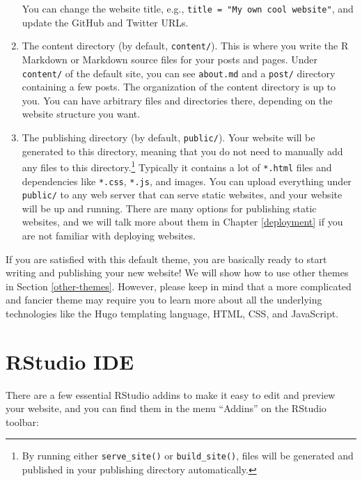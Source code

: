 \documentclass[12pt,]{krantz}
\theoremstyle{definition}
\theoremstyle{definition}
\theoremstyle{definition}
\theoremstyle{remark}
\begin{document}
\begin{enumerate}
  You can change the website title, e.g.,
  \texttt{title\ =\ "My\ own\ cool\ website"}, and update the GitHub and
  Twitter URLs.
\item
  The content directory (by default, \texttt{content/}). This is where
  you write the R Markdown or Markdown source files for your posts and
  pages. Under \texttt{content/} of the default site, you can see
  \texttt{about.md} and a \texttt{post/} directory containing a few
  posts. The organization of the content directory is up to you. You can
  have arbitrary files and directories there, depending on the website
  structure you want.
\item
  The publishing directory (by default, \texttt{public/}). Your website
  will be generated to this directory, meaning that you do not need to
  manually add any files to this directory.\footnote{By running either
    \texttt{serve\_site()} or \texttt{build\_site()}, files will be
    generated and published in your publishing directory automatically.}
  Typically it contains a lot of \texttt{*.html} files and dependencies
  like \texttt{*.css}, \texttt{*.js}, and images. You can upload
  everything under \texttt{public/} to any web server that can serve
  static websites, and your website will be up and running. There are
  many options for publishing static websites, and we will talk more
  about them in Chapter \ref{deployment} if you are not familiar with
  deploying websites.
\end{enumerate}

If you are satisfied with this default theme, you are basically ready to
start writing and publishing your new website! We will show how to use
other themes in Section \ref{other-themes}. However, please keep in mind
that a more complicated and fancier theme may require you to learn more
about all the underlying technologies like the Hugo templating language,
HTML, CSS, and JavaScript.

\section{RStudio IDE}\label{rstudio-ide}

There are a few essential RStudio addins to make
it easy to edit and preview your website, and you can find them in the
menu ``Addins'' on the RStudio toolbar:
\end{document}
